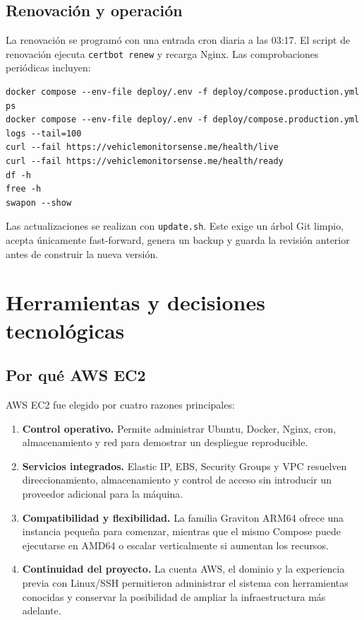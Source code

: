 \documentclass[12pt,a4paper,oneside]{report}
\newcommand{\code}[1]{\texttt{\small #1}}
\begin{document}
\section{Renovación y operación}

La renovación se programó con una entrada cron diaria a las 03:17. El script de
renovación ejecuta \code{certbot renew} y recarga Nginx. Las
comprobaciones periódicas incluyen:

\begin{lstlisting}
docker compose --env-file deploy/.env -f deploy/compose.production.yml ps
docker compose --env-file deploy/.env -f deploy/compose.production.yml logs --tail=100
curl --fail https://vehiclemonitorsense.me/health/live
curl --fail https://vehiclemonitorsense.me/health/ready
df -h
free -h
swapon --show
\end{lstlisting}

Las actualizaciones se realizan con \code{update.sh}. Este exige un árbol Git
limpio, acepta únicamente fast-forward, genera un backup y guarda la revisión
anterior antes de construir la nueva versión.

\chapter{Herramientas y decisiones tecnológicas}

\section{Por qué AWS EC2}

AWS EC2 fue elegido por cuatro razones principales:

\begin{enumerate}
  \item \textbf{Control operativo.} Permite administrar Ubuntu, Docker, Nginx,
        cron, almacenamiento y red para demostrar un despliegue reproducible.
  \item \textbf{Servicios integrados.} Elastic IP, EBS, Security Groups y
        VPC resuelven direccionamiento, almacenamiento y control de acceso
        sin introducir un proveedor adicional para la máquina.
  \item \textbf{Compatibilidad y flexibilidad.} La familia Graviton ARM64 ofrece
        una instancia pequeña para comenzar, mientras que el mismo Compose puede
        ejecutarse en AMD64 o escalar verticalmente si aumentan los recursos.
  \item \textbf{Continuidad del proyecto.} La cuenta AWS, el dominio y la
        experiencia previa con Linux/SSH permitieron administrar el sistema con
        herramientas conocidas y conservar la posibilidad de ampliar la
        infraestructura más adelante.
\end{enumerate}
\end{document}

